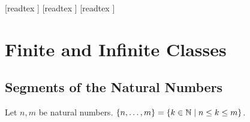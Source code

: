 \documentclass[10pt]{article}
\begin{document}
  \begin{imports}
    \begin{forthel}
      [readtex ]
      [readtex ]
      [readtex ]
    \end{forthel}
  \end{imports}


  \section*{Finite and Infinite Classes}

  \subsection*{Segments of the Natural Numbers}

  \begin{forthel}
    \begin{definition}
      Let $n, m$ be natural numbers.
      $\{ n, \dots, m \} = \{ k \in \mathbb{N} \mid n \leq k \leq m \}$.
    \end{definition}
  \end{forthel}
\end{document}
